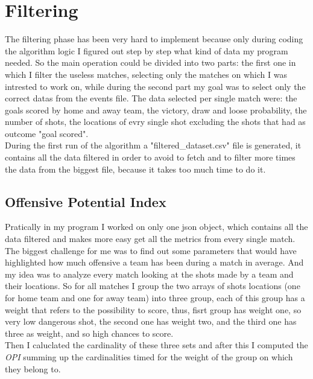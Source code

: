 \documentclass[a4paper,titlepage,11pt]{report}
\begin{document}
{\section{
Filtering}
The filtering phase has been very hard to implement because only during coding the algorithm logic I figured out step by step what kind of data my program needed. So the main operation could be divided into two parts: the first one in which I filter the useless matches, selecting only the matches on which I was intrested to work on, while during the second part my goal was to select only the correct datas from the events file. The data selected per single match were: the goals scored by home and away team, the victory, draw and loose probability, the number of shots, the locations of evry single shot excluding the shots that had as outcome "goal scored".\\
During the first run of the algorithm a "filtered\_dataset.csv" file is generated, it contains all the data filtered in order to avoid to fetch and to filter more times the data from the biggest file, because it takes too much time to do it. 

\subsection{
Offensive Potential Index}
Pratically in my program I worked on only one json object, which contains all the data filtered and makes more easy get all the metrics from every single match. The biggest challenge for me was to find out some parameters that would have highlighted how much offensive a team has been during a match in average. And my idea was to analyze every match looking at the shots made by a team and their locations. So for all matches I group the two arrays of shots locations (one for home team and one for away team) into three group, each of this group has a weight that refers to the possibility to score, thus, fisrt group has weight one, so very low dangerous shot, the second one has weight two, and the third one has three as weight, and so high chances to score.\\
Then I caluclated the cardinality of these three sets and after this I computed the \textit{OPI} summing up the cardinalities timed for the weight of the group on which they belong to.


}
\end{document}
